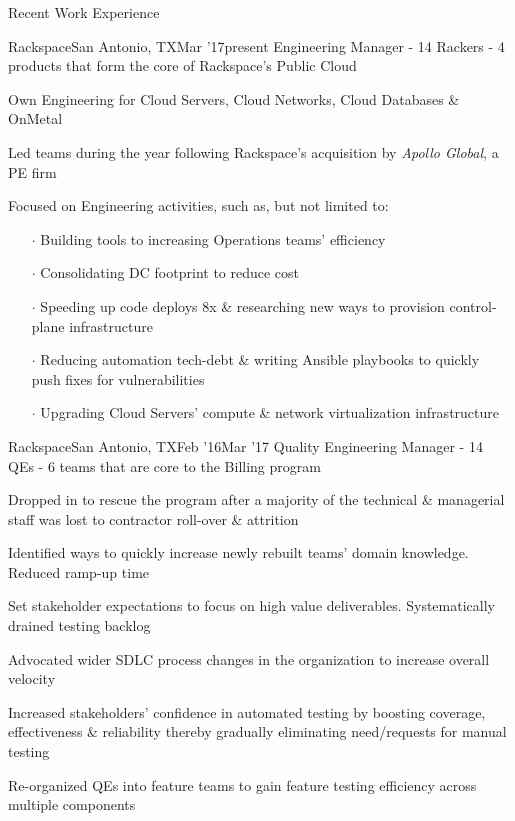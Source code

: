 \documentclass{resume} %
\begin{document}
\begin{rSection}{Recent Work Experience}

\begin{rSubsection}{Rackspace}{San Antonio, TX}{Mar '17}{present}
{Engineering Manager - 14 Rackers - 4 products that form the core of Rackspace's Public Cloud}
  
\item Own Engineering for Cloud Servers, Cloud Networks, Cloud Databases \& OnMetal
\item Led teams during the year following Rackspace's acquisition by {\em Apollo Global}, a PE firm
\item Focused on Engineering activities, such as, but not limited to:
  \vspace{-0.5em}
  \begin{itemize}  \itemsep0.5pt \parskip0pt
    \item[$\cdot$] Building tools to increasing Operations teams' efficiency
    \item[$\cdot$] Consolidating DC footprint to reduce cost
    \item[$\cdot$] Speeding up code deploys 8x \& researching new ways to provision control-plane infrastructure
    \item[$\cdot$] Reducing automation tech-debt \& writing Ansible playbooks to quickly push fixes for vulnerabilities
    \item[$\cdot$] Upgrading Cloud Servers' compute \& network virtualization infrastructure
\end{itemize}
  
\end{rSubsection}
  
\begin{rSubsection}{Rackspace}{San Antonio, TX}{Feb '16}{Mar '17}
{Quality Engineering Manager - 14 QEs - 6 teams that are core to the Billing program}
  
\item Dropped in to rescue the program after a majority of the technical \& managerial staff was lost to contractor roll-over \& attrition
\item Identified ways to quickly increase newly rebuilt teams' domain knowledge. Reduced ramp-up time
\item Set stakeholder expectations to focus on high value deliverables. Systematically drained testing backlog
\item Advocated wider SDLC process changes in the organization to increase overall velocity
\item Increased stakeholders' confidence in automated testing by boosting coverage, effectiveness \& reliability thereby gradually eliminating need/requests for manual testing
\item Re-organized QEs into feature teams to gain feature testing efficiency across multiple components
  

\end{rSubsection}
\end{rSection}
\end{document}
